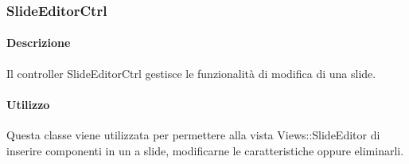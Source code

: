 %		  
%	
\newpage
	
\subsubsection{SlideEditorCtrl}
	\paragraph{Descrizione}
	Il controller SlideEditorCtrl gestisce le funzionalità di modifica di una slide.
	
	\paragraph{Utilizzo}
	Questa classe viene utilizzata per permettere alla vista Views::SlideEditor di inserire componenti in un a slide, modificarne le caratteristiche oppure eliminarli.\\
